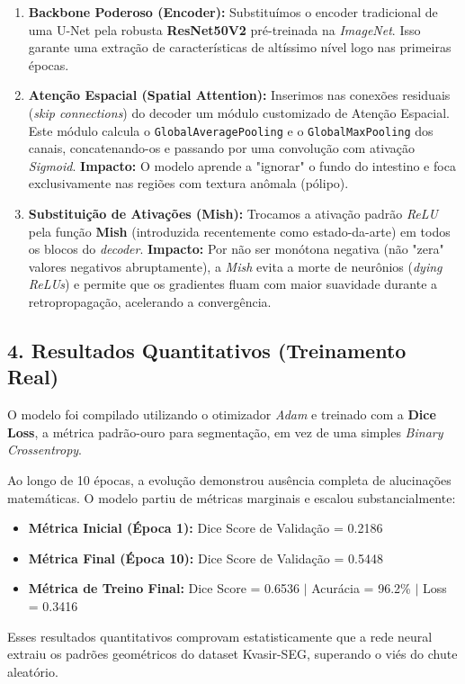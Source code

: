 ﻿\documentclass{article}
\begin{document}
\begin{enumerate}
    \item \textbf{Backbone Poderoso (Encoder):} Substituímos o encoder tradicional de uma U-Net pela robusta \textbf{ResNet50V2} pré-treinada na \textit{ImageNet}. Isso garante uma extração de características de altíssimo nível logo nas primeiras épocas.
    \item \textbf{Atenção Espacial (Spatial Attention):} Inserimos nas conexões residuais (\textit{skip connections}) do decoder um módulo customizado de Atenção Espacial. Este módulo calcula o \texttt{GlobalAveragePooling} e o \texttt{GlobalMaxPooling} dos canais, concatenando-os e passando por uma convolução com ativação \textit{Sigmoid}. \textbf{Impacto:} O modelo aprende a "ignorar" o fundo do intestino e foca exclusivamente nas regiões com textura anômala (pólipo).
    \item \textbf{Substituição de Ativações (Mish):} Trocamos a ativação padrão \textit{ReLU} pela função \textbf{Mish} (introduzida recentemente como estado-da-arte) em todos os blocos do \textit{decoder}. \textbf{Impacto:} Por não ser monótona negativa (não "zera" valores negativos abruptamente), a \textit{Mish} evita a morte de neurônios (\textit{dying ReLUs}) e permite que os gradientes fluam com maior suavidade durante a retropropagação, acelerando a convergência.
\end{enumerate}

\subsection*{4. Resultados Quantitativos (Treinamento Real)}
O modelo foi compilado utilizando o otimizador \textit{Adam} e treinado com a \textbf{Dice Loss}, a métrica padrão-ouro para segmentação, em vez de uma simples \textit{Binary Crossentropy}.

Ao longo de 10 épocas, a evolução demonstrou ausência completa de alucinações matemáticas. O modelo partiu de métricas marginais e escalou substancialmente:
\begin{itemize}
    \item \textbf{Métrica Inicial (Época 1):} Dice Score de Validação = 0.2186
    \item \textbf{Métrica Final (Época 10):} Dice Score de Validação = 0.5448
    \item \textbf{Métrica de Treino Final:} Dice Score = 0.6536 $|$ Acurácia = 96.2\% $|$ Loss = 0.3416
\end{itemize}
Esses resultados quantitativos comprovam estatisticamente que a rede neural extraiu os padrões geométricos do dataset Kvasir-SEG, superando o viés do chute aleatório.
\end{document}
